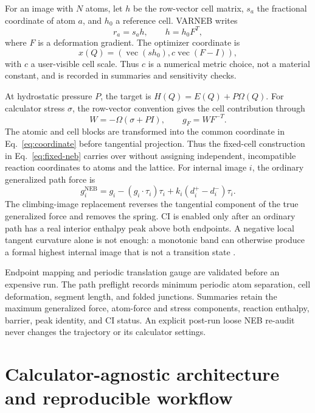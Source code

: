 \documentclass[final,3p,times]{elsarticle}
\begin{document}
For an image with $N$ atoms, let $h$ be the row-vector cell matrix, $s_a$ the
fractional coordinate of atom $a$, and $h_0$ a reference cell. VARNEB writes
\begin{equation}
 r_a=s_a h,\qquad h=h_0F^T,
\end{equation}
where $F$ is a deformation gradient. The optimizer coordinate is
\begin{equation}
 x(Q)=\left(\operatorname{vec}(s h_0),c\operatorname{vec}(F-I)\right),
 \label{eq:coordinate}
\end{equation}
with $c$ a user-visible cell scale. Thus $c$ is a numerical metric choice, not
a material constant, and is recorded in summaries and sensitivity checks.

At hydrostatic pressure $P$, the target is $H(Q)=E(Q)+P\Omega(Q)$. For
calculator stress $\sigma$, the row-vector convention gives the cell
contribution through
\begin{equation}
 W=-\Omega(\sigma+PI),\qquad g_F=WF^{-T}.
 \label{eq:cellforce}
\end{equation}
The atomic and cell blocks are transformed into the common coordinate in
Eq.~\ref{eq:coordinate} before tangential projection.  Thus the fixed-cell
construction in Eq.~\ref{eq:fixed-neb} carries over without assigning
independent, incompatible reaction coordinates to atoms and the lattice.  For
internal image $i$, the ordinary generalized path force is
\begin{equation}
 g_i^{\mathrm{NEB}}=g_i-(g_i\cdot\tau_i)\tau_i+
 k_i(d_i^+-d_i^-)\tau_i.
 \label{eq:nebforce}
\end{equation}
The climbing-image replacement reverses the tangential component of the true
generalized force and removes the spring. CI is enabled only after an ordinary
path has a real interior enthalpy peak above both endpoints. A negative local
tangent curvature alone is not enough: a monotonic band can otherwise produce
a formal highest internal image that is not a transition state
\cite{Henkelman2000}.

Endpoint mapping and periodic translation gauge are validated before an
expensive run. The path preflight records minimum periodic atom separation,
cell deformation, segment length, and folded junctions. Summaries retain the
maximum generalized force, atom-force and stress components, reaction enthalpy,
barrier, peak identity, and CI status. An explicit post-run loose NEB re-audit
never changes the trajectory or its calculator settings.

\section{Calculator-agnostic architecture and reproducible workflow}
\label{sec:software}
\end{document}
